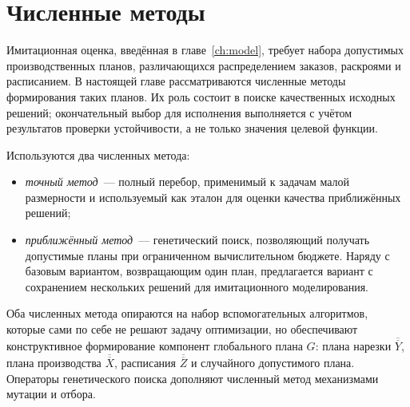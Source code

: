 \chapter{Численные методы}\label{ch:algorithm}

Имитационная оценка, введённая в главе~\ref{ch:model}, требует набора допустимых производственных планов, различающихся распределением заказов, раскроями и расписанием. В настоящей главе рассматриваются численные методы формирования таких планов. Их роль состоит в поиске качественных исходных решений; окончательный выбор для исполнения выполняется с учётом результатов проверки устойчивости, а не только значения целевой функции.

Используются два численных метода:
\begin{itemize}
  \item \textit{точный метод}~--- полный перебор, применимый к задачам малой размерности и используемый как эталон для оценки качества приближённых решений;
  \item \textit{приближённый метод}~--- генетический поиск, позволяющий получать допустимые планы при ограниченном вычислительном бюджете. Наряду с базовым вариантом, возвращающим один план, предлагается вариант с сохранением нескольких решений для имитационного моделирования.
\end{itemize}

Оба численных метода опираются на набор вспомогательных алгоритмов, которые сами по себе не решают задачу оптимизации, но обеспечивают конструктивное формирование компонент глобального плана $G$: плана нарезки $\overline{\overline{Y}}$, плана производства $\overline{\overline{X}}$, расписания $\overline{\overline{Z}}$ и случайного допустимого плана. Операторы генетического поиска дополняют численный метод механизмами мутации и отбора.

